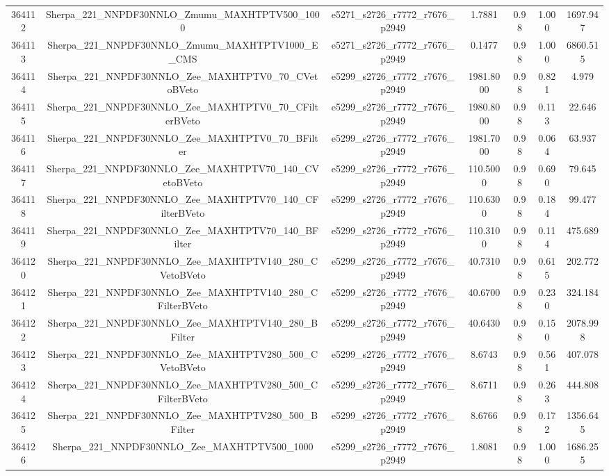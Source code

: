 \begin{table}[htbp]
\begin{center}
{\begin{tabular}{ccccccc}
364112 & Sherpa\_221\_NNPDF30NNLO\_Zmumu\_MAXHTPTV500\_1000 & e5271\_s2726\_r7772\_r7676\_p2949 & 1.7881 & 0.98 & 1.000 & 1697.947 \\ 
364113 & Sherpa\_221\_NNPDF30NNLO\_Zmumu\_MAXHTPTV1000\_E\_CMS & e5271\_s2726\_r7772\_r7676\_p2949 & 0.1477 & 0.98 & 1.000 & 6860.515 \\ 
364114 & Sherpa\_221\_NNPDF30NNLO\_Zee\_MAXHTPTV0\_70\_CVetoBVeto & e5299\_s2726\_r7772\_r7676\_p2949 & 1981.8000 & 0.98 & 0.821 & 4.979 \\ 
364115 & Sherpa\_221\_NNPDF30NNLO\_Zee\_MAXHTPTV0\_70\_CFilterBVeto & e5299\_s2726\_r7772\_r7676\_p2949 & 1980.8000 & 0.98 & 0.113 & 22.646 \\ 
364116 & Sherpa\_221\_NNPDF30NNLO\_Zee\_MAXHTPTV0\_70\_BFilter & e5299\_s2726\_r7772\_r7676\_p2949 & 1981.7000 & 0.98 & 0.064 & 63.937 \\ 
364117 & Sherpa\_221\_NNPDF30NNLO\_Zee\_MAXHTPTV70\_140\_CVetoBVeto & e5299\_s2726\_r7772\_r7676\_p2949 & 110.5000 & 0.98 & 0.690 & 79.645 \\ 
364118 & Sherpa\_221\_NNPDF30NNLO\_Zee\_MAXHTPTV70\_140\_CFilterBVeto & e5299\_s2726\_r7772\_r7676\_p2949 & 110.6300 & 0.98 & 0.184 & 99.477 \\ 
364119 & Sherpa\_221\_NNPDF30NNLO\_Zee\_MAXHTPTV70\_140\_BFilter & e5299\_s2726\_r7772\_r7676\_p2949 & 110.3100 & 0.98 & 0.114 & 475.689 \\ 
364120 & Sherpa\_221\_NNPDF30NNLO\_Zee\_MAXHTPTV140\_280\_CVetoBVeto & e5299\_s2726\_r7772\_r7676\_p2949 & 40.7310 & 0.98 & 0.615 & 202.772 \\ 
364121 & Sherpa\_221\_NNPDF30NNLO\_Zee\_MAXHTPTV140\_280\_CFilterBVeto & e5299\_s2726\_r7772\_r7676\_p2949 & 40.6700 & 0.98 & 0.230 & 324.184 \\ 
364122 & Sherpa\_221\_NNPDF30NNLO\_Zee\_MAXHTPTV140\_280\_BFilter & e5299\_s2726\_r7772\_r7676\_p2949 & 40.6430 & 0.98 & 0.150 & 2078.998 \\ 
364123 & Sherpa\_221\_NNPDF30NNLO\_Zee\_MAXHTPTV280\_500\_CVetoBVeto & e5299\_s2726\_r7772\_r7676\_p2949 & 8.6743 & 0.98 & 0.561 & 407.078 \\ 
364124 & Sherpa\_221\_NNPDF30NNLO\_Zee\_MAXHTPTV280\_500\_CFilterBVeto & e5299\_s2726\_r7772\_r7676\_p2949 & 8.6711 & 0.98 & 0.263 & 444.808 \\ 
364125 & Sherpa\_221\_NNPDF30NNLO\_Zee\_MAXHTPTV280\_500\_BFilter & e5299\_s2726\_r7772\_r7676\_p2949 & 8.6766 & 0.98 & 0.172 & 1356.645 \\ 
364126 & Sherpa\_221\_NNPDF30NNLO\_Zee\_MAXHTPTV500\_1000 & e5299\_s2726\_r7772\_r7676\_p2949 & 1.8081 & 0.98 & 1.000 & 1686.255 \\ 

\end{tabular}}
\end{center}
\end{table}

